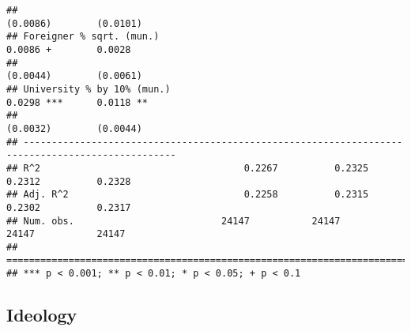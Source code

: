 \documentclass[
]{article}
\begin{document}
\begin{verbatim}
##                                                                       (0.0086)        (0.0101)   
## Foreigner % sqrt. (mun.)                                               0.0086 +        0.0028    
##                                                                       (0.0044)        (0.0061)   
## University % by 10% (mun.)                                             0.0298 ***      0.0118 ** 
##                                                                       (0.0032)        (0.0044)   
## -------------------------------------------------------------------------------------------------
## R^2                                    0.2267          0.2325          0.2312          0.2328    
## Adj. R^2                               0.2258          0.2315          0.2302          0.2317    
## Num. obs.                          24147           24147           24147           24147         
## =================================================================================================
## *** p < 0.001; ** p < 0.01; * p < 0.05; + p < 0.1
\end{verbatim}

\hypertarget{ideology}{%
\subsection{Ideology}\label{ideology}}
\end{document}
